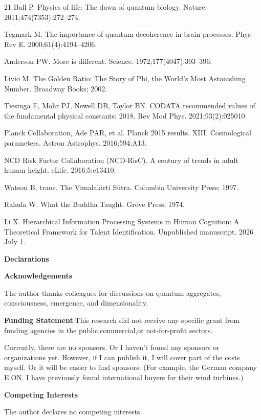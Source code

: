 \documentclass[11pt,a4paper]{article}
\begin{document}
\begin{thebibliography}{21}
 Ball P. Physics of life: The dawn of quantum biology. Nature. 2011;474(7353):272--274.

 Tegmark M. The importance of quantum decoherence in brain processes. Phys Rev E. 2000;61(4):4194--4206.

 Anderson PW. More is different. Science. 1972;177(4047):393--396.

 Livio M. The Golden Ratio: The Story of Phi, the World's Most Astonishing Number. Broadway Books; 2002.

 Tiesinga E, Mohr PJ, Newell DB, Taylor BN. CODATA recommended values of the fundamental physical constants: 2018. Rev Mod Phys. 2021;93(2):025010.

 Planck Collaboration, Ade PAR, et al. Planck 2015 results. XIII. Cosmological parameters. Astron Astrophys. 2016;594:A13.

 NCD Risk Factor Collaboration (NCD-RisC). A century of trends in adult human height. eLife. 2016;5:e13410.

 Watson B, trans. The Vimalak\={\i}rti S\={u}tra. Columbia University Press; 1997.

 Rahula W. What the Buddha Taught. Grove Press; 1974.

 Li X. Hierarchical Information Processing Systems in Human Cognition: A Theoretical Framework for Talent Identification. Unpublished manuscript. 2026 July 1.


\textbf{\textbf{Declarations}}

  
  
  \textbf{\textbf{Acknowledgements}}

The author thanks colleagues for discussions on quantum aggregates, consciousness, emergence, and dimensionality. 

 \textbf{\textbf{Funding Statement}}:This research did not receive any specific grant from funding agencies in the public,commercial,or not-for-profit sectors.

Currently, there are no sponsors. Or I haven't found any sponsors or organizations yet. However, if I can publish it, I will cover part of the costs myself. Or it will be easier to find sponsors. (For example, the German company E.ON. I have previously found international buyers for their wind turbines.)

 \textbf{\textbf{Competing Interests}}

The author declares no competing interests.


\end{thebibliography}
\end{document}
